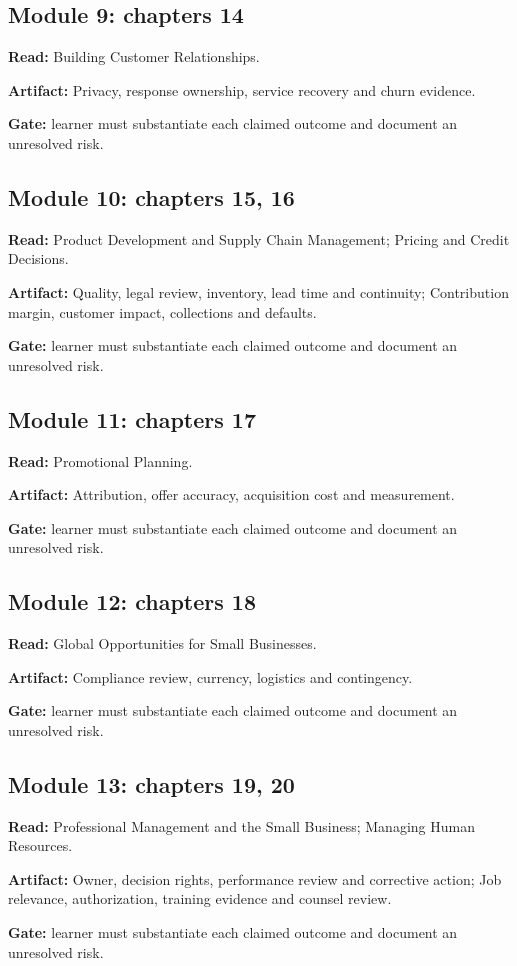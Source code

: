 \documentclass[11pt]{article}
\begin{document}
\subsection*{Module 9: chapters 14}
\textbf{Read:} Building Customer Relationships.\par
\textbf{Artifact:} Privacy, response ownership, service recovery and churn evidence.\par
\textbf{Gate:} learner must substantiate each claimed outcome and document an unresolved risk.\par
\subsection*{Module 10: chapters 15, 16}
\textbf{Read:} Product Development and Supply Chain Management; Pricing and Credit Decisions.\par
\textbf{Artifact:} Quality, legal review, inventory, lead time and continuity; Contribution margin, customer impact, collections and defaults.\par
\textbf{Gate:} learner must substantiate each claimed outcome and document an unresolved risk.\par
\subsection*{Module 11: chapters 17}
\textbf{Read:} Promotional Planning.\par
\textbf{Artifact:} Attribution, offer accuracy, acquisition cost and measurement.\par
\textbf{Gate:} learner must substantiate each claimed outcome and document an unresolved risk.\par
\subsection*{Module 12: chapters 18}
\textbf{Read:} Global Opportunities for Small Businesses.\par
\textbf{Artifact:} Compliance review, currency, logistics and contingency.\par
\textbf{Gate:} learner must substantiate each claimed outcome and document an unresolved risk.\par
\subsection*{Module 13: chapters 19, 20}
\textbf{Read:} Professional Management and the Small Business; Managing Human Resources.\par
\textbf{Artifact:} Owner, decision rights, performance review and corrective action; Job relevance, authorization, training evidence and counsel review.\par
\textbf{Gate:} learner must substantiate each claimed outcome and document an unresolved risk.\par
\end{document}

